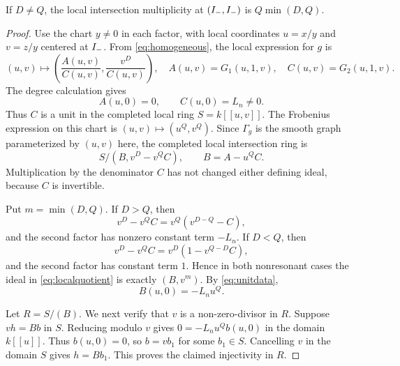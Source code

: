 \begin{lemma}\label{lem:minuslength}
If $D\ne Q$, the local intersection multiplicity at $(I_{-},I_{-})$ is
$Q\min(D,Q)$.
\end{lemma}

\begin{proof}
Use the chart $y\ne0$ in each factor, with local coordinates
$u=x/y$ and $v=z/y$ centered at $I_{-}$. From \eqref{eq:homogeneous},
the local expression for $g$ is
\begin{equation}\label{eq:minuschart}
 (u,v)\longmapsto
 \left(\frac{A(u,v)}{C(u,v)},\frac{v^D}{C(u,v)}\right),
 \quad A(u,v)=G_1(u,1,v),\quad C(u,v)=G_2(u,1,v).
\end{equation}
The degree calculation gives
\begin{equation}\label{eq:unitdata}
 A(u,0)=0,\qquad C(u,0)=L_n\ne0.
\end{equation}
Thus $C$ is a unit in the completed local ring $S=k[[u,v]]$. The
Frobenius expression on this chart is $(u,v)\mapsto(u^Q,v^Q)$.
Since $\Gamma_g$ is the smooth graph parameterized by $(u,v)$ here,
the completed local intersection ring is
\begin{equation}\label{eq:localquotient}
 S/(B,v^D-v^Q C),\qquad B=A-u^QC.
\end{equation}
Multiplication by the denominator $C$ has not changed either defining
ideal, because $C$ is invertible.

Put $m=\min(D,Q)$. If $D>Q$, then
\[
 v^D-v^Q C=v^Q(v^{D-Q}-C),
\]
and the second factor has nonzero constant term $-L_n$. If $D<Q$, then
\[
 v^D-v^Q C=v^D(1-v^{Q-D}C),
\]
and the second factor has constant term $1$. Hence in both nonresonant
cases the ideal in \eqref{eq:localquotient} is exactly $(B,v^m)$.
By \eqref{eq:unitdata},
\begin{equation}\label{eq:Bmodv}
 B(u,0)=-L_nu^Q.
\end{equation}

Let $R=S/(B)$. We next verify that $v$ is a non-zero-divisor in $R$.
Suppose $vh=Bb$ in $S$. Reducing modulo $v$ gives
$0=-L_nu^Q b(u,0)$ in the domain $k[[u]]$. Thus $b(u,0)=0$, so
$b=vb_1$ for some $b_1\in S$. Cancelling $v$ in the domain $S$ gives
$h=Bb_1$. This proves the claimed injectivity in $R$.


\end{proof}
